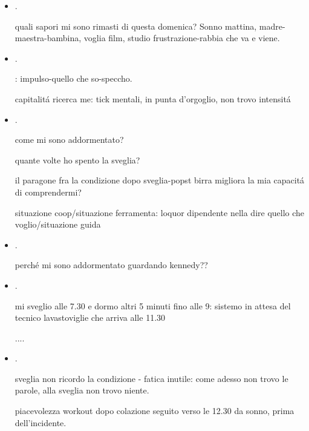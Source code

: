 \begin{itemize}
non mi ricordo di controllare impulsi loquor e 

alla peruzza non riesco a controllare impulsi loquor

mi addormento alle 4

\item {}.

quali sapori mi sono rimasti di questa domenica? Sonno mattina, madre-maestra-bambina, voglia film, studio frustrazione-rabbia che va e viene.


\item {}.

: impulso-quello che so-speccho.

capitalit\'a ricerca me: tick mentali, in punta d'orgoglio, non trovo intensit\'a


\item {}.

come mi sono addormentato?

quante volte ho spento la sveglia?

il paragone fra la condizione dopo sveglia-popst birra migliora la mia capacit\'a di comprendermi?

situazione coop/situazione ferramenta: loquor dipendente nella dire quello che voglio/situazione guida


\item {}.

perch\'e mi sono addormentato guardando kennedy??

\item {}.

mi sveglio alle 7.30 e dormo altri 5 minuti fino alle 9: sistemo in attesa del tecnico lavastoviglie che arriva alle 11.30

....

\item {}.

sveglia non ricordo la condizione - fatica inutile: come adesso non trovo le parole, alla sveglia non trovo niente.

piacevolezza workout dopo colazione seguito verso le 12.30 da sonno, prima dell'incidente.


\end{itemize}
